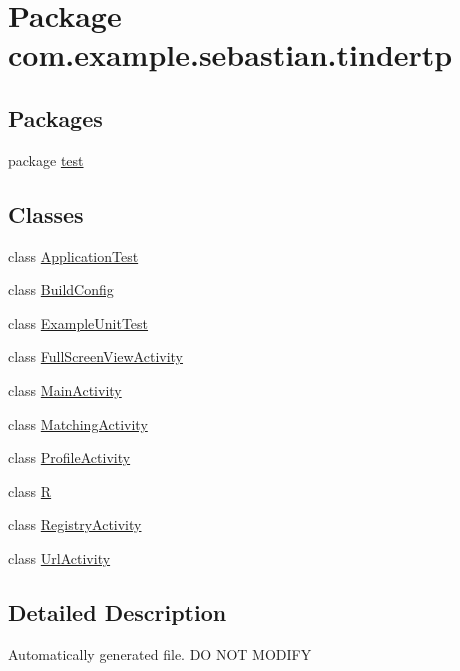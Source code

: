 \hypertarget{namespacecom_1_1example_1_1sebastian_1_1tindertp}{}\section{Package com.\+example.\+sebastian.\+tindertp}
\label{namespacecom_1_1example_1_1sebastian_1_1tindertp}
\subsection*{Packages}
\begin{DoxyCompactItemize}
\item 
package \hyperlink{namespacecom_1_1example_1_1sebastian_1_1tindertp_1_1test}{test}
\end{DoxyCompactItemize}
\subsection*{Classes}
\begin{DoxyCompactItemize}
\item 
class \hyperlink{classcom_1_1example_1_1sebastian_1_1tindertp_1_1ApplicationTest}{Application\+Test}
\item 
class \hyperlink{classcom_1_1example_1_1sebastian_1_1tindertp_1_1BuildConfig}{Build\+Config}
\item 
class \hyperlink{classcom_1_1example_1_1sebastian_1_1tindertp_1_1ExampleUnitTest}{Example\+Unit\+Test}
\item 
class \hyperlink{classcom_1_1example_1_1sebastian_1_1tindertp_1_1FullScreenViewActivity}{Full\+Screen\+View\+Activity}
\item 
class \hyperlink{classcom_1_1example_1_1sebastian_1_1tindertp_1_1MainActivity}{Main\+Activity}
\item 
class \hyperlink{classcom_1_1example_1_1sebastian_1_1tindertp_1_1MatchingActivity}{Matching\+Activity}
\item 
class \hyperlink{classcom_1_1example_1_1sebastian_1_1tindertp_1_1ProfileActivity}{Profile\+Activity}
\item 
class \hyperlink{classcom_1_1example_1_1sebastian_1_1tindertp_1_1R}{R}
\item 
class \hyperlink{classcom_1_1example_1_1sebastian_1_1tindertp_1_1RegistryActivity}{Registry\+Activity}
\item 
class \hyperlink{classcom_1_1example_1_1sebastian_1_1tindertp_1_1UrlActivity}{Url\+Activity}
\end{DoxyCompactItemize}


\subsection{Detailed Description}
Automatically generated file. DO N\+OT M\+O\+D\+I\+FY 